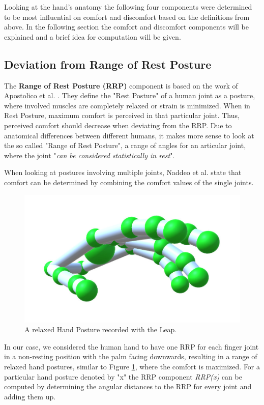 Looking at the hand's anatomy the following four components were determined to be most influential on comfort and discomfort based on the definitions from above. In the following section the comfort and discomfort components will be explained and a brief idea for computation will be given. 

\subsection{Deviation from Range of Rest Posture}

The \textbf{Range of Rest Posture (RRP)} component is based on the work of Apostolico et al. \cite{apostolico2014postural}. They define the "Rest Posture" of a human joint as a posture, where involved muscles are completely relaxed or strain is minimized. When in Rest Posture, maximum comfort is perceived in that particular joint. Thus, perceived comfort should decrease when deviating from the RRP. 
Due to anatomical differences between different humans, it makes more sense to look at the so called "Range of Rest Posture", a range of angles for an articular joint, where the joint "\textit{can be considered statistically in rest}".

When looking at postures involving multiple joints, Naddeo et al. \cite{naddeo2015proposal} state that comfort can be determined by combining the comfort values of the single joints.

\begin{figure}
\centering
\includegraphics[width=\textwidth]{relaxed}
\caption{A relaxed Hand Posture recorded with the Leap.}
\label{fig:relaxed}
\end{figure}

In our case, we considered the human hand to have one RRP for each finger joint in a non-resting position with the palm facing downwards, resulting in a range of relaxed hand postures, similar to Figure \ref{fig:relaxed}, where the comfort is maximized. For a particular hand posture denoted by "x" the RRP component \textit{RRP(x)} can be computed by determining the angular distances to the RRP for every joint and adding them up.

